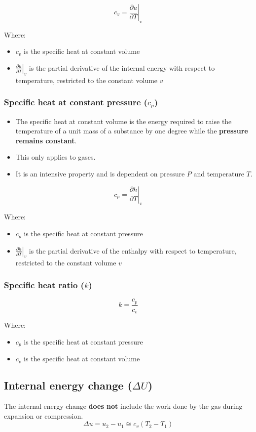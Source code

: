 \documentclass[11pt]{article}
\begin{document}
\[c_v = \left. \frac{\partial u}{\partial T} \right|_v\]

Where:
\begin{itemize}
\item \(c_v\) is the specific heat at constant volume
\item \(\left. \frac{\partial u}{\partial T} \right|_v\) is the partial derivative of the internal energy with respect to temperature, restricted to the constant volume \(v\)
\end{itemize}

\subsubsection{Specific heat at constant pressure (\(c_p\))}
\label{sec:org11ab1c7}
\begin{itemize}
\item The specific heat at constant volume is the energy required to raise the temperature of a unit mass of a substance by one degree while the \textbf{pressure remains constant}.
\item This only applies to gases.
\item It is an intensive property and is dependent on pressure \(P\) and temperature \(T\).
\end{itemize}

\[c_p = \left. \frac{\partial h}{\partial T} \right|_v\]

Where:
\begin{itemize}
\item \(c_p\) is the specific heat at constant pressure
\item \(\left. \frac{\partial h}{\partial T} \right|_v\) is the partial derivative of the enthalpy with respect to temperature, restricted to the constant volume \(v\)
\end{itemize}

\subsubsection{Specific heat ratio (\(k\))}
\label{sec:org4e19675}
\[k = \frac{c_p}{c_v}\]

Where:
\begin{itemize}
\item \(c_p\) is the specific heat at constant pressure
\item \(c_v\) is the specific heat at constant volume
\end{itemize}

\subsection{Internal energy change (\(\Delta U\))}
\label{sec:org7593f7c}
The internal energy change \textbf{does not} include the work done by the gas during expansion or compression.
\[\Delta u = u_2 - u_1 \cong c_v \left(T_2 - T_1 \right)\]
\end{document}
